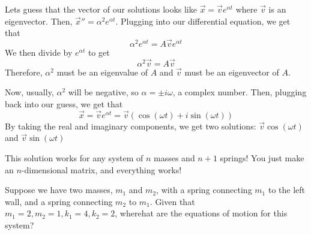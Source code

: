 \documentclass{article}
\begin{document}
\begin{solution}
Lets guess that the vector of our solutions looks like $\vec{x} = \vec{v}e^{\alpha t}$ where $\vec{v}$ is an eigenvector. Then, $\vec{x}'' = \alpha^2e^{\alpha t}$. Plugging into our differential equation, we get that$$\alpha^2e^{\alpha t} = A\vec{v}e^{\alpha t}$$We then divide by $e^{\alpha t}$ to get$$\alpha^2\vec{v} = A\vec{v}$$Therefore, $\alpha^2$ must be an eigenvalue of $A$ and $\vec{v}$ must be an eigenvector of $A$. 

Now, usually, $\alpha^2$ will be negative, so $\alpha = \pm i\omega$, a complex number. Then, plugging back into our guess, we get that $$\vec{x} = \vec{v}e^{\alpha t} = \vec{v}(\cos(\omega t) + i\sin(\omega t))$$By taking the real and imaginary components, we get two solutions: $\vec{v}\cos(\omega t)$ and $\vec{v}\sin(\omega t)$
\end{solution}

This solution works for any system of $n$ masses and $n+1$ springs! You just make an $n$-dimensional matrix, and everything works!

\begin{example}
Suppose we have two masses, $m_1$ and $m_2$, with a spring connecting $m_1$ to the left wall, and a spring connecting $m_2$ to $m_1$. Given that $m_1 = 2, m_2 = 1, k_1 = 4, k_2 = 2$, wherehat are the equations of motion for this system?
\end{example}
\end{document}
